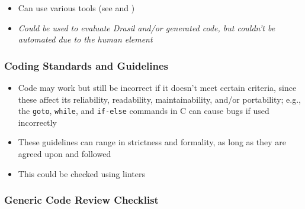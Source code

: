\begin{itemize}
      \item Can use various tools (see  and
            )

      \item \emph{Could be used to evaluate Drasil and/or generated code, but
                  couldn't be automated due to the human element}

\end{itemize}

\subsubsection{Coding Standards and Guidelines \citep[pp.~96-99]{Patton2006}}
\label{code-stds-and-guidelines}

\begin{itemize}
      \item Code may work but still be incorrect if it doesn't meet certain
            criteria, since these affect its reliability, readability,
            maintainability, and/or portability; e.g., the \texttt{goto},
            \texttt{while}, and \texttt{if-else} commands in C can cause bugs
            if used incorrectly \citep[p.~96]{Patton2006}
      \item These guidelines can range in strictness and formality, as long as
            they are agreed upon and followed \citep[p.~96]{Patton2006}
      \item This could be checked using linters
\end{itemize}

\subsubsection{Generic Code Review Checklist \citep[pp.~99-103]{Patton2006}}
\label{gen-code-review-checklist}


